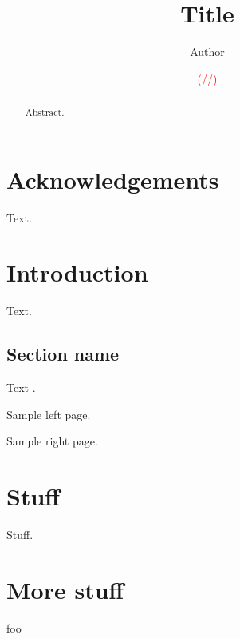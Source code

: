 \documentclass[12pt]{memoir}
\newcommand{\draftstamp}{\textcolor{red}{(\number\month/\number\day/\the\year)}}
\begin{document}
\frontmatter

\pagestyle{empty}

\title{\textbf{Title}}
\author{Author}
\date{\draftstamp}




\maketitle

\pagestyle{nonumbers}

\begin{abstract}
Abstract.
\end{abstract}

\chapter{Acknowledgements}

Text.

\cleardoublepage
\tableofcontents

\mainmatter

\chapter{Introduction}

Text.

\section{Section name}

Text \citep{HoTT13}.

\clearpage

Sample left page.

\clearpage

Sample right page.

\chapter{Stuff}

Stuff.

\appendix

\chapter{More stuff}

foo

\backmatter

\printbibliography
\end{document}

